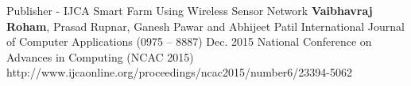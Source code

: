 


\begin{cventries}

  \cvpublicationentry
    {Publisher - IJCA} %
    {Smart Farm Using Wireless Sensor Network} %
    {\textbf{Vaibhavraj Roham}, Prasad Rupnar, Ganesh Pawar and Abhijeet Patil} %
    {International Journal of Computer Applications (0975 – 8887)}
    {Dec. 2015} %
    {National Conference on Advances in Computing (NCAC 2015)}
    {http://www.ijcaonline.org/proceedings/ncac2015/number6/23394-5062}
    

\end{cventries}